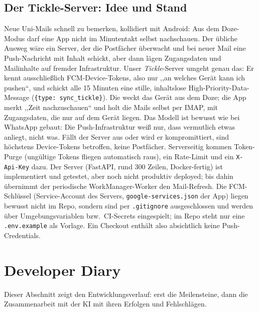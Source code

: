 \documentclass{msereport}
\begin{document}
\msegap

\subsection{Der Tickle-Server: Idee und Stand}

Neue Uni-Mails schnell zu bemerken, kollidiert mit Android: Aus dem
Doze-Modus darf eine App nicht im Minutentakt selbst nachschauen. Der übliche
Ausweg wäre ein Server, der die Postfächer überwacht und bei neuer Mail eine
Push-Nachricht mit Inhalt schickt, aber dann lägen Zugangsdaten und
Mailinhalte auf fremder Infrastruktur. Unser \emph{Tickle}-Server umgeht genau
das: Er kennt ausschließlich FCM-Device-Tokens, also nur ,,an welches Gerät
kann ich pushen``, und schickt alle 15 Minuten eine stille, inhaltslose
High-Priority-Data-Message (\texttt{\{type: sync\_tickle\}}). Die weckt das
Gerät aus dem Doze; die App merkt ,,Zeit nachzuschauen`` und holt die Mails
selbst per IMAP, mit Zugangsdaten, die nur auf dem Gerät liegen. Das Modell ist
bewusst wie bei WhatsApp gebaut: Die Push-Infrastruktur weiß nur, dass
vermutlich etwas anliegt, nicht was. Fällt der Server aus oder wird er
kompromittiert, sind höchstens Device-Tokens betroffen, keine Postfächer.
Serverseitig kommen Token-Purge (ungültige Tokens fliegen automatisch raus),
ein Rate-Limit und ein \texttt{X-Api-Key} dazu. Der Server (FastAPI, rund
300 Zeilen, Docker-fertig) ist implementiert und getestet, aber noch nicht
produktiv deployed; bis dahin übernimmt der periodische WorkManager-Worker den
Mail-Refresh. Die FCM-Schlüssel (Service-Account des Servers,
\texttt{google-services.json} der App) liegen bewusst nicht im Repo, sondern
sind per \texttt{.gitignore} ausgeschlossen und werden über Umgebungsvariablen
bzw.\ CI-Secrets eingespielt; im Repo steht nur eine \texttt{.env.example} als
Vorlage. Ein Checkout enthält also absichtlich keine Push-Credentials.

\msegap

\section{Developer Diary}

Dieser Abschnitt zeigt den Entwicklungsverlauf: erst die Meilensteine, dann die
Zusammenarbeit mit der KI mit ihren Erfolgen und Fehlschlägen.
\par\vspace{6pt}
\end{document}
